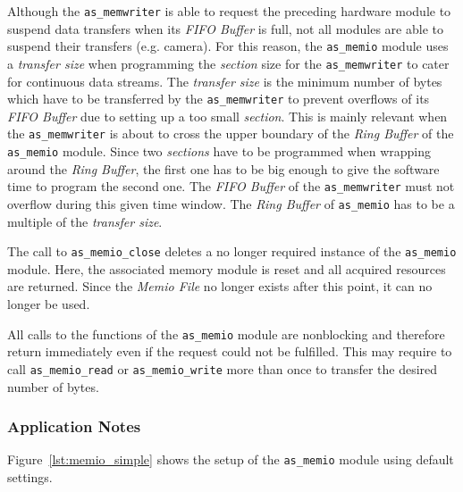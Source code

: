 Although the \texttt{as\_memwriter} is able to request the preceding hardware module to suspend data transfers when its \textit{FIFO Buffer} is full, not all modules are able to suspend their transfers (e.g. camera).
For this reason, the \texttt{as\_memio} module uses a \textit{transfer size} when programming the \textit{section} size for the \texttt{as\_memwriter} to cater for continuous data streams.
The \textit{transfer size} is the minimum number of bytes which have to be transferred by the \texttt{as\_memwriter} to prevent overflows of its \textit{FIFO Buffer} due to setting up a too small \textit{section}.
This is mainly relevant when the \texttt{as\_memwriter} is about to cross the upper boundary of the \textit{Ring Buffer} of the \texttt{as\_memio} module.
Since two \textit{sections} have to be programmed when wrapping around the \textit{Ring Buffer}, the first one has to be big enough to give the software time to program the second one.
The \textit{FIFO Buffer} of the \texttt{as\_memwriter} must not overflow during this given time window.
The \textit{Ring Buffer} of \texttt{as\_memio} has to be a multiple of the \textit{transfer size}.

The call to \texttt{as\_memio\_close} deletes a no longer required instance of the \texttt{as\_memio} module.
Here, the associated memory module is reset and all acquired resources are returned. 
Since the \textit{Memio File} no longer exists after this point, it can no longer be used. 

All calls to the functions of the \texttt{as\_memio} module are nonblocking and therefore return immediately even if the request could not be fulfilled.
This may require to call \texttt{as\_memio\_read} or \texttt{as\_memio\_write} more than once to transfer the desired number of bytes.



\subsubsection{Application Notes}
Figure~\ref{lst:memio_simple} shows the setup of the \texttt{as\_memio} module using default settings.

